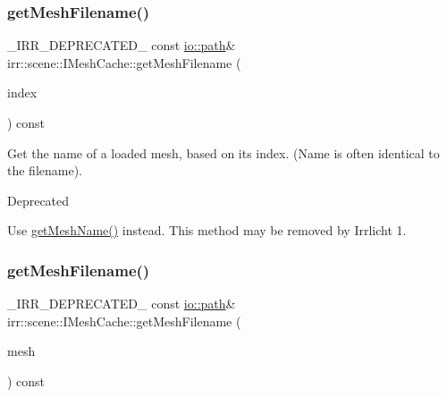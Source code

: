 \subsubsection{\texorpdfstring{get\+Mesh\+Filename()}{getMeshFilename()}\hspace{0.1cm}{\footnotesize\ttfamily [1/2]}}
{\footnotesize\ttfamily \+\_\+\+I\+R\+R\+\_\+\+D\+E\+P\+R\+E\+C\+A\+T\+E\+D\+\_\+ const \hyperlink{namespaceirr_1_1io_ab1bdc45edb3f94d8319c02bc0f840ee1}{io\+::path}\& irr\+::scene\+::\+I\+Mesh\+Cache\+::get\+Mesh\+Filename (\begin{DoxyParamCaption}\item[{\hyperlink{namespaceirr_a0416a53257075833e7002efd0a18e804}{u32}}]{index }\end{DoxyParamCaption}) const\hspace{0.3cm}{\ttfamily [inline]}}



Get the name of a loaded mesh, based on its index. (Name is often identical to the filename). 

\begin{DoxyRefDesc}{Deprecated}
\item[\hyperlink{deprecated__deprecated000010}{Deprecated}]Use \hyperlink{classirr_1_1scene_1_1IMeshCache_af06efb8fb21f6bba16e52d879b5d3ddd}{get\+Mesh\+Name()} instead. This method may be removed by Irrlicht 1. \end{DoxyRefDesc}
\mbox{\label{classirr_1_1scene_1_1IMeshCache_adc17a943cd79a94710def8dd7d2de605}} 
\subsubsection{\texorpdfstring{get\+Mesh\+Filename()}{getMeshFilename()}\hspace{0.1cm}{\footnotesize\ttfamily [2/2]}}
{\footnotesize\ttfamily \+\_\+\+I\+R\+R\+\_\+\+D\+E\+P\+R\+E\+C\+A\+T\+E\+D\+\_\+ const \hyperlink{namespaceirr_1_1io_ab1bdc45edb3f94d8319c02bc0f840ee1}{io\+::path}\& irr\+::scene\+::\+I\+Mesh\+Cache\+::get\+Mesh\+Filename (\begin{DoxyParamCaption}\item[{const \hyperlink{classirr_1_1scene_1_1IMesh}{I\+Mesh} $\ast$const}]{mesh }\end{DoxyParamCaption}) const\hspace{0.3cm}{\ttfamily [inline]}}



